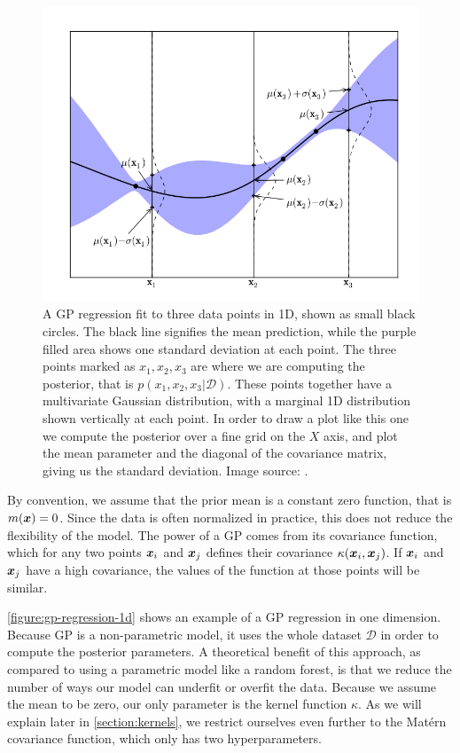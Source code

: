 \begin{figure}
	\begin{center}
		\includegraphics[width=1.0\textwidth]{images/gp-1d.png}
    \caption{A GP regression fit to three data points in 1D, shown as small
    black circles. The black line signifies the mean prediction, while the
    purple filled area shows one standard deviation at each point. The three
    points marked as $x_1, x_2, x_3$ are where we are computing the posterior, that
    is $p(x_1, x_2, x_3 | \mathcal{D})$. These points together have a
    multivariate Gaussian distribution, with a marginal 1D distribution shown
    vertically at each point. In order to draw a plot like this one we compute the
    posterior over a fine grid on the $X$ axis, and plot the mean parameter and the
    diagonal of the covariance matrix, giving us the standard deviation. Image
    source: \cite{nando-bopt-tutorial}.}
		\label{figure:gp-regression-1d}
	\end{center}
\end{figure}

By convention, we assume that the prior mean is a constant zero function, that
is $m({\boldsymbol{x}}) = 0$. Since the data is often normalized in practice, this does not
reduce the flexibility of the model. The power of a GP comes from its
covariance function, which for any two points ${\boldsymbol{x}}_i$ and ${\boldsymbol{x}}_j$ defines their
covariance $\kappa({\boldsymbol{x}}_i, {\boldsymbol{x}}_j)$. If ${\boldsymbol{x}}_i$ and ${\boldsymbol{x}}_j$ have a high covariance,
the values of the function at those points will be similar.

\autoref{figure:gp-regression-1d} shows an example of a GP regression in one
dimension. Because GP is a non-parametric model, it uses the whole dataset
$\mathcal{D}$ in order to compute the posterior parameters. A theoretical
benefit of this approach, as compared to using a parametric model like a random
forest, is that we reduce the number of ways our model can underfit or overfit
the data. Because we assume the mean to be zero, our only parameter is the
kernel function $\kappa$. As we will explain later in
\autoref{section:kernels}, we restrict ourselves even further to the Mat\'ern
covariance function, which only has two hyperparameters.

